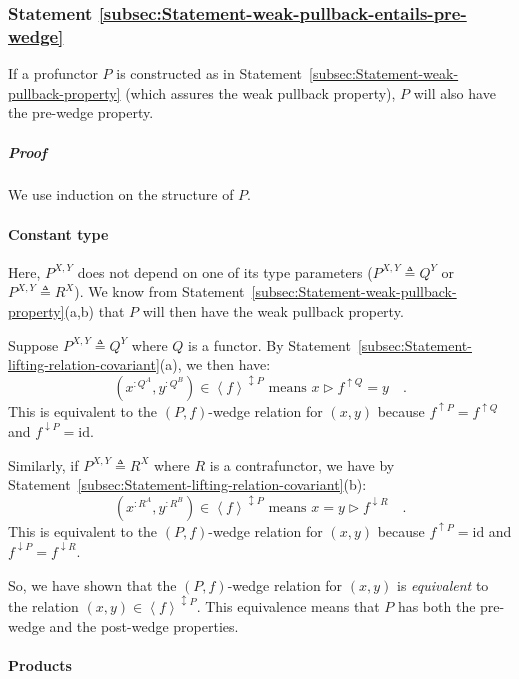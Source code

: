 \subsubsection{Statement \label{subsec:Statement-weak-pullback-entails-pre-wedge}\ref{subsec:Statement-weak-pullback-entails-pre-wedge}}

If a profunctor $P$ is constructed as in Statement~\ref{subsec:Statement-weak-pullback-property}
(which assures the weak pullback property), $P$ will also have the
pre-wedge property.

\subparagraph{Proof}

We use induction on the structure of $P$.

\paragraph{Constant type}

Here, $P^{X,Y}$ does not depend on one of its type parameters ($P^{X,Y}\triangleq Q^{Y}$
or $P^{X,Y}\triangleq R^{X}$). We know from Statement~\ref{subsec:Statement-weak-pullback-property}(a,b)
that $P$ will then have the weak pullback property.

Suppose $P^{X,Y}\triangleq Q^{Y}$ where $Q$ is a functor. By Statement~\ref{subsec:Statement-lifting-relation-covariant}(a),
we then have:
\[
(x^{:Q^{A}},y^{:Q^{B}})\in\left<f\right>^{\updownarrow P}\text{ means }x\triangleright f^{\uparrow Q}=y\quad.
\]
This is equivalent to the $\left(P,f\right)$-wedge relation for $(x,y)$
because $f^{\uparrow P}=f^{\uparrow Q}$ and $f^{\downarrow P}=\text{id}$.

Similarly, if $P^{X,Y}\triangleq R^{X}$ where $R$ is a contrafunctor,
we have by Statement~\ref{subsec:Statement-lifting-relation-covariant}(b):
\[
(x^{:R^{A}},y^{:R^{B}})\in\left<f\right>^{\updownarrow P}\text{ means }x=y\triangleright f^{\downarrow R}\quad.
\]
This is equivalent to the $\left(P,f\right)$-wedge relation for $(x,y)$
because $f^{\uparrow P}=\text{id}$ and $f^{\downarrow P}=f^{\downarrow R}$.

So, we have shown that the $\left(P,f\right)$-wedge relation for
$(x,y)$ is \emph{equivalent} to the relation $(x,y)\in\left<f\right>^{\updownarrow P}$.
This equivalence means that $P$ has both the pre-wedge and the post-wedge
properties.

\paragraph{Products}

